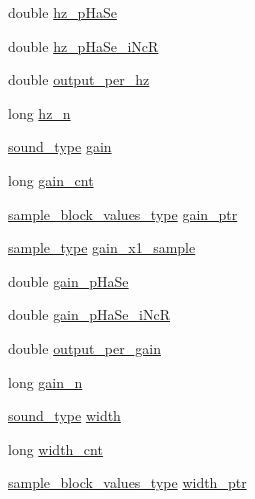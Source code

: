 \begin{DoxyCompactItemize}
\item 
double \hyperlink{structeqbandvvv__susp__struct_a44f5f246c5c3c887a6eb861c537b0806}{hz\+\_\+p\+Ha\+Se}
\item 
double \hyperlink{structeqbandvvv__susp__struct_a63440b5901ad9c6a48ea2e20369e62ba}{hz\+\_\+p\+Ha\+Se\+\_\+i\+NcR}
\item 
double \hyperlink{structeqbandvvv__susp__struct_a69fe33993bd90aa1a1b9e4f02f7eff02}{output\+\_\+per\+\_\+hz}
\item 
long \hyperlink{structeqbandvvv__susp__struct_ac4c42bcc708a99c76e38875d7a552d27}{hz\+\_\+n}
\item 
\hyperlink{sound_8h_a792cec4ed9d6d636d342d9365ba265ea}{sound\+\_\+type} \hyperlink{structeqbandvvv__susp__struct_a7183925f088ed1e250e9e6a313e29a26}{gain}
\item 
long \hyperlink{structeqbandvvv__susp__struct_a1c8a63bf2805f0090179a32791faad5d}{gain\+\_\+cnt}
\item 
\hyperlink{sound_8h_a83d17f7b465d1591f27cd28fc5eb8a03}{sample\+\_\+block\+\_\+values\+\_\+type} \hyperlink{structeqbandvvv__susp__struct_a67fcdff014d3b9787d0a274ab28353f1}{gain\+\_\+ptr}
\item 
\hyperlink{sound_8h_a3a9d1d4a1c153390d2401a6e9f71b32c}{sample\+\_\+type} \hyperlink{structeqbandvvv__susp__struct_a9504c6ff2a94189ff83a54234e8581bf}{gain\+\_\+x1\+\_\+sample}
\item 
double \hyperlink{structeqbandvvv__susp__struct_a9e29ebf635c585ce7950e79916d4e466}{gain\+\_\+p\+Ha\+Se}
\item 
double \hyperlink{structeqbandvvv__susp__struct_a5bb8586f835505ae614ab1a48b99859c}{gain\+\_\+p\+Ha\+Se\+\_\+i\+NcR}
\item 
double \hyperlink{structeqbandvvv__susp__struct_a98aa699c8eab2ff455adedeb79602d98}{output\+\_\+per\+\_\+gain}
\item 
long \hyperlink{structeqbandvvv__susp__struct_a3dfa2902ec1a5f10b1fec7412264b3d0}{gain\+\_\+n}
\item 
\hyperlink{sound_8h_a792cec4ed9d6d636d342d9365ba265ea}{sound\+\_\+type} \hyperlink{structeqbandvvv__susp__struct_a5b24a6bef0c9907111095be7d645190f}{width}
\item 
long \hyperlink{structeqbandvvv__susp__struct_af00282468ea353386ee2c035b1aa6efd}{width\+\_\+cnt}
\item 
\hyperlink{sound_8h_a83d17f7b465d1591f27cd28fc5eb8a03}{sample\+\_\+block\+\_\+values\+\_\+type} \hyperlink{structeqbandvvv__susp__struct_a2bbbca8fc89520121de9c239ef7df1c2}{width\+\_\+ptr}
\item 

\end{DoxyCompactItemize}
